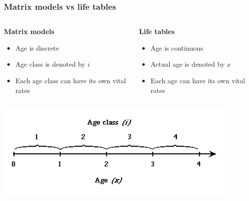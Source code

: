 \documentclass[color=usenames,dvipsnames]{beamer}\usepackage[]{graphicx}\usepackage[]{xcolor}
\begin{document}
\begin{frame}
  \frametitle{Matrix models vs life tables}
  \begin{columns}
    \begin{column}[T]{0.5\textwidth}
      {\bf Matrix models}
      \begin{itemize}
        \item<1-> Age is discrete
        \item<2-> Age class is denoted by $i$
        \item<3-> Each age class can have its own vital rates
      \end{itemize}
    \end{column}
    \begin{column}[T]{0.5\textwidth}
      {\bf Life tables}
      \begin{itemize}
        \item<1-> Age is continuous
        \item<2-> Actual age is denoted by $x$
        \item<3-> Each age can have its own vital rates
      \end{itemize}
    \end{column}
  \end{columns}
  \begin{center}
    \includegraphics[width=0.9\textwidth]{figs/age-class-diagram}
  \end{center}
\end{frame}
\end{document}
